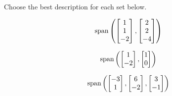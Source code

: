 \documentclass{ximera}
\begin{document}
\begin{problem}
Choose the best description for each set below.
  \begin{problem}
  $$\textnormal{span}\left(\begin{bmatrix}1\\1\\-2\end{bmatrix}, \begin{bmatrix}2\\2\\-4\end{bmatrix}\right)$$
  
  \begin{multipleChoice}
 \end{multipleChoice}
  \end{problem}
  
  \begin{problem}
  $$\textnormal{span}\left(\begin{bmatrix}1\\-2\end{bmatrix}, \begin{bmatrix}1\\0\end{bmatrix}\right)$$
  
   \begin{multipleChoice}
  
\end{multipleChoice}
  \end{problem}
  \begin{problem}
  $$\textnormal{span}\left(\begin{bmatrix}-3\\1\end{bmatrix}, \begin{bmatrix}6\\-2\end{bmatrix}, \begin{bmatrix}3\\-1\end{bmatrix}\right)$$
  
  \begin{multipleChoice}
  
\end{multipleChoice}
  
  \end{problem}
\end{problem}
\end{document}
